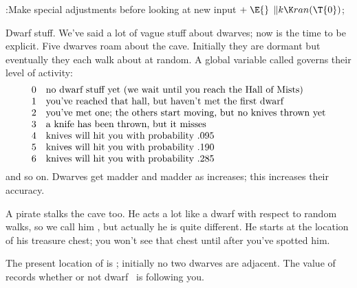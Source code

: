 \Y\B\4:Make special adjustments before looking at new input\X${}\mathrel+%
\E{}$\6
$\|k\K\\{ran}(\T{0}){}$;\par
\fi

Dwarf stuff. We've said a lot of vague stuff about dwarves; now is
the time
to be explicit. Five dwarves roam about the cave. Initially they are
dormant but eventually they each walk about at random.
A global variable called  governs their level of activity:
$$\vcenter{\halign{#\quad&#\hfil\cr
0&no dwarf stuff yet (we wait until you reach the Hall of Mists)\cr
1&you've reached that hall, but haven't met the first dwarf\cr
2&you've met one; the others start moving, but no knives thrown yet\cr
3&a knife has been thrown, but it misses\cr
4&knives will hit you with probability .095\cr
5&knives will hit you with probability .190\cr
6&knives will hit you with probability .285\cr}}$$
and so on. Dwarves get madder and madder as  increases; this
increases their accuracy.

A pirate stalks the cave too. He acts a lot like a dwarf with respect to
random walks, so we call him , but actually he is quite
different.
He starts at the location of his treasure chest; you won't see that chest
until after you've spotted him.

The present location of  is ; initially no
two
dwarves are adjacent. The value of
 records whether or not dwarf~ is following you.

